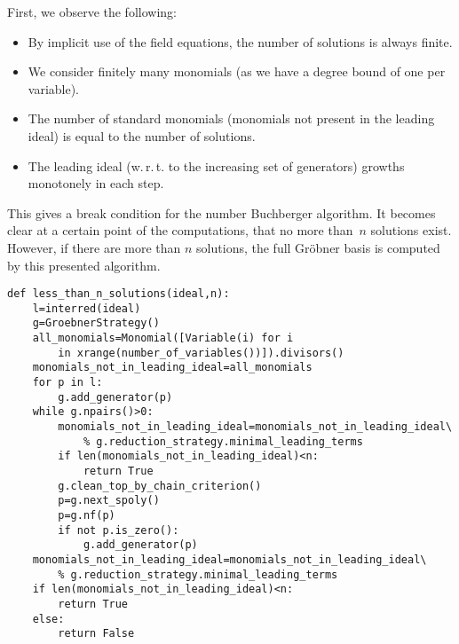 \documentclass[]{article}
\newcommand{\Groebner}{Gr\"{o}bner\xspace}
\newcounter{thm}
\begin{document}
First, we observe the following:
\begin{itemize}
    \item By implicit use of the field equations, the number of solutions is always finite.
    \item We consider finitely many monomials (as we have a degree bound of one per variable).
    \item The number of standard monomials (monomials not present in the leading ideal) is equal to the number of solutions.
    \item The leading ideal (w.\,r.\,t. to the increasing set of generators) growths monotonely in each step.
\end{itemize}
This gives a break condition for the number Buchberger algorithm. It becomes
clear at a certain point of the computations,  that no more than~$n$ solutions exist.
However, if there are more than $n$ solutions, the full \Groebner basis is computed by this presented algorithm.
\begin{lstlisting}
def less_than_n_solutions(ideal,n):
    l=interred(ideal)
    g=GroebnerStrategy()
    all_monomials=Monomial([Variable(i) for i 
        in xrange(number_of_variables())]).divisors()
    monomials_not_in_leading_ideal=all_monomials
    for p in l:
        g.add_generator(p)
    while g.npairs()>0:
        monomials_not_in_leading_ideal=monomials_not_in_leading_ideal\
            % g.reduction_strategy.minimal_leading_terms
        if len(monomials_not_in_leading_ideal)<n:
            return True
        g.clean_top_by_chain_criterion()
        p=g.next_spoly()
        p=g.nf(p)
        if not p.is_zero():
            g.add_generator(p)
    monomials_not_in_leading_ideal=monomials_not_in_leading_ideal\
        % g.reduction_strategy.minimal_leading_terms
    if len(monomials_not_in_leading_ideal)<n:
        return True
    else:
        return False
\end{lstlisting}


%

\end{document}
